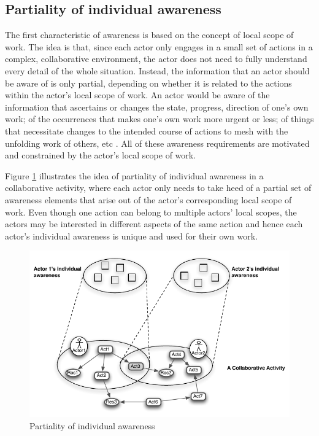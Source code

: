 \subsection{Partiality of individual awareness} %
\label{sub:partiality_of_awareness}
The first characteristic of awareness is based on the concept of local scope of work. The idea is that, since each actor only engages in a small set of actions in a complex, collaborative environment, the actor does not need to fully understand every detail of the whole situation. Instead, the information that an actor should be aware of is only partial, depending on whether it is related to the actions within the actor's local scope of work. An actor would be aware of the information that ascertains or changes the state, progress, direction of one's own work; of the occurrences that makes one's own work more urgent or less; of things that necessitate changes to the intended course of actions to mesh with the unfolding work of others, etc \cite{schmidt2002a}. All of these awareness requirements are motivated and constrained by the actor's local scope of work.

Figure \ref{fig:partiality_of_awareness} illustrates the idea of partiality of individual awareness in a collaborative activity, where each actor only needs to take heed of a partial set of awareness elements that arise out of the actor's corresponding local scope of work. Even though one action can belong to multiple actors' local scopes, the actors may be interested in different aspects of the same action and hence each actor's individual awareness is unique and used for their own work.

\begin{figure}[htbp] %
   \centering
   \includegraphics{partiality_of_awareness.pdf} 
   \caption{Partiality of individual awareness}
   \label{fig:partiality_of_awareness}
\end{figure}

